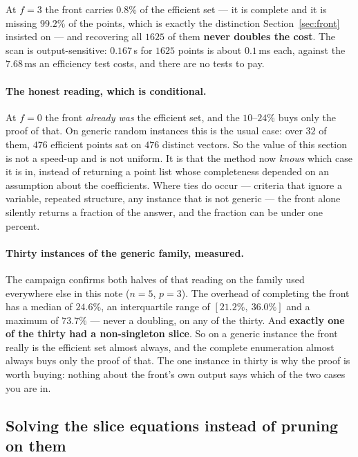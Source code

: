 \documentclass[11pt,a4paper]{article}
\begin{document}
\noindent
At $f = 3$ the front carries $0.8\%$ of the efficient set --- it is complete
and it is missing $99.2\%$ of the points, which is exactly the distinction
Section~\ref{sec:front} insisted on --- and recovering all $1625$ of them
\textbf{never doubles the cost}.  The scan is output-sensitive: $0.167$\,s for
$1625$ points is about $0.1$\,ms each, against the $7.68$\,ms an efficiency
test costs, and there are no tests to pay.

\paragraph{The honest reading, which is conditional.}  At $f = 0$ the front
\emph{already was} the efficient set, and the $10$--$24\%$ buys only the proof
of that.  On generic random instances this is the usual case: over $32$ of
them, $476$ efficient points sat on $476$ distinct vectors.  So the value of
this section is not a speed-up and is not uniform.  It is that the method now
\emph{knows} which case it is in, instead of returning a point list whose
completeness depended on an assumption about the coefficients.  Where ties do
occur --- criteria that ignore a variable, repeated structure, any instance
that is not generic --- the front alone silently returns a fraction of the
answer, and the fraction can be under one percent.

\paragraph{Thirty instances of the generic family, measured.}  The campaign
confirms both halves of that reading on the family used everywhere else in this
note ($n=5$, $p=3$).  The overhead of completing the front has a median of
$24.6\%$, an interquartile range of $[21.2\%,\ 36.0\%]$ and a maximum of
$73.7\%$ --- never a doubling, on any of the thirty.  And \textbf{exactly one
of the thirty had a non-singleton slice}.  So on a generic instance the front
really is the efficient set almost always, and the complete enumeration almost
always buys only the proof of that.  The one instance in thirty is why the
proof is worth buying: nothing about the front's own output says which of the
two cases you are in.

\subsection{Solving the slice equations instead of pruning on them}
\label{sec:elim}
\end{document}
